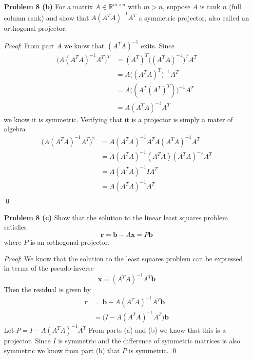 \documentclass[12pt]{article}
\newcommand{\problem}[1]{\hspace{-4 ex} \large \textbf{Problem #1} }
\renewenvironment{proof}{\hspace{-4 ex} \emph{Proof}:}{\qed}
\newcommand{\RR}{\mathbb{R}}
\begin{document}
\bigbreak

\problem{8 (b)} For a matrix $A \in \RR^{m \times n}$ with $m>n$, suppose $A$ is rank $n$ (full column rank) and show that $A(A^TA)^{-1}A^T$ a symmetric projector, also called an orthogonal projector.

\begin{proof}
	From part $A$ we know that $(A^TA)^{-1}$ exits. Since
	\begin{align*}
		\big( A(A^TA)^{-1}A^T \big)^T & = (A^T)^T \big( (A^TA)^{-1} \big)^T A^T \\
		& = A \big( (A^TA)^{T} \big)^{-1} A^T \\
		& = A \big( (A^T(A^T)^T) \big)^{-1} A^T \\
		& = A(A^TA)^{-1}A^T
	\end{align*}
	we know it is symmetric. Verifying that it is a projector is simply a mater of algebra
	\begin{align*}
		\big( A(A^TA)^{-1}A^T \big)^2 & = A(A^TA)^{-1}A^T A(A^TA)^{-1}A^T \\
		& = A(A^TA)^{-1} (A^T A) (A^TA)^{-1}A^T \\
		& = A(A^TA)^{-1} I A^T \\
		& = A(A^TA)^{-1} A^T \\
	\end{align*}
\end{proof}

\bigbreak

\problem{8 (c)} Show that the solution to the linear least squares problem satisfies
$$
\mathbf{r} = \mathbf{b} - A \mathbf{x} = P \mathbf{b}
$$
where $P$ is an orthogonal projector.

\begin{proof}
	We know that the solution to the least squares problem can be expressed in terms of the pseudo-inverse
	$$
		\mathbf{x} = (A^TA)^{-1}A^T \mathbf{b}
	$$
	Then the residual is given by
	\begin{align*}
		\mathbf{r} & = \mathbf{b} - A (A^TA)^{-1}A^T \mathbf{b} \\
		& = \big( I - A (A^TA)^{-1}A^T \big) \mathbf{b}
	\end{align*}
	Let $P = I - A (A^TA)^{-1}A^T$ From parts (a) and (b) we know that this is a projector. Since $I$ is symmetric and the difference of symmetric matrices is also symmetric we know from part (b) that $P$ is symmetric.
\end{proof}
\end{document}
